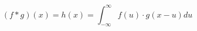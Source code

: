 \documentclass[12pt,a4paper]{article}
\begin{document}
	\begin{displaymath}
	(f \ast g)(x) = h(x) = \int_{-\infty }^{\infty }f(u)\cdot g(x - u)du 
	\end{displaymath}
\end{document}
